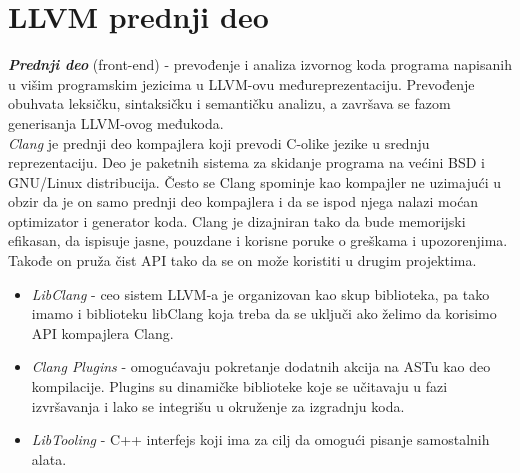 \documentclass[10pt]{extarticle}
\begin{document}
\section{LLVM prednji deo}
\noindent
\textit{\textbf{Prednji deo}} (front-end) - prevođenje i analiza izvornog koda programa napisanih u višim programskim jezicima u LLVM-ovu međureprezentaciju. Prevođenje obuhvata leksičku, sintaksičku i semantičku analizu, a završava se fazom generisanja LLVM-ovog međukoda. \\
\textit{Clang} je prednji deo kompajlera koji prevodi C-olike jezike u srednju reprezentaciju. Deo je paketnih sistema za skidanje programa na većini BSD i GNU/Linux distribucija. Često se Clang spominje kao kompajler ne uzimajući u obzir da je on samo prednji deo kompajlera i da se ispod njega nalazi moćan optimizator i generator koda.
Clang je dizajniran tako da bude memorijski efikasan, da ispisuje jasne, pouzdane i korisne poruke o greškama i upozorenjima. Takođe on pruža čist API tako da se on može koristiti u drugim projektima.
\begin{itemize}
    \item \textit{LibClang} - ceo sistem LLVM-a je organizovan kao skup biblioteka, pa tako imamo i biblioteku libClang koja treba da se uključi ako želimo da korisimo API kompajlera Clang.
    \item \textit{Clang Plugins} - omogućavaju pokretanje dodatnih akcija na ASTu kao deo kompilacije. Plugins su dinamičke biblioteke koje se učitavaju u fazi izvršavanja i lako se integrišu u okruženje za izgradnju koda.
    \item \textit{LibTooling} - C++ interfejs koji ima za cilj da omogući pisanje samostalnih alata.
\end{itemize}
\end{document}
